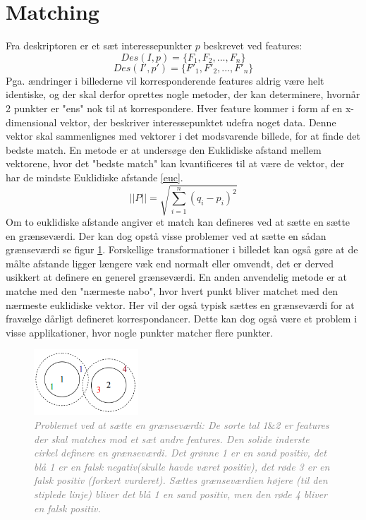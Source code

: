 \section{Matching}
Fra deskriptoren er et sæt interessepunkter $p$ beskrevet ved features:
$$ Des(I,p)= \lbrace F_1,F_2,...,F_n \rbrace $$
$$ Des(I',p')=\lbrace F'_1,F'_2,...,F'_n \rbrace $$
Pga. ændringer i billederne vil korresponderende features aldrig være helt identiske, og der skal derfor oprettes nogle metoder, der kan determinere, hvornår 2 punkter er "ens" nok til at korrespondere.
Hver feature kommer i form af en x-dimensional vektor, der beskriver interessepunktet udefra noget data. Denne vektor skal sammenlignes med vektorer i det modsvarende billede, for at finde det bedste match. En metode er at undersøge den Euklidiske afstand mellem vektorene, hvor det "bedste match" kan kvantificeres til at være de vektor, der har de mindste Euklidiske afstande \eqref{euc}. 
\begin{equation}
||P|| = \sqrt{\sum\limits_{i=1}^n(q_i-p_i)^2}
\label{euc}
\end{equation}
Om to euklidiske afstande angiver et match kan defineres ved at sætte en sætte en grænseværdi. Der kan dog opstå visse problemer ved at sætte en sådan grænseværdi se figur \ref{fig:skift}. Forskellige transformationer i billedet kan også gøre at de målte afstande ligger længere væk end normalt eller omvendt, det er derved usikkert at definere en generel grænseværdi. En anden anvendelig metode er at matche med den "nærmeste nabo", hvor hvert punkt bliver matchet med den nærmeste euklidiske vektor. Her vil der også typisk sættes en grænseværdi for at fravælge dårligt defineret korrespondancer. Dette kan dog også være et problem i visse applikationer, hvor nogle punkter matcher flere punkter.
\begin{figure}[H]
    \centering
    \includegraphics[width=0.35\textwidth]{fig/22.png}
    \vspace{-0.5em}   
    \begin{center}
    \caption{\textcolor{gray}{\footnotesize \textit{Problemet ved at sætte en grænseværdi: De sorte tal 1$\&$2 er features der skal matches mod et sæt andre features. Den solide inderste cirkel definere  en grænseværdi. Det grønne {\color{OliveGreen}1} er en sand positiv, det blå {\color{blue}1} er en falsk negativ(skulle havde været positiv), det røde {\color{red}3} er en falsk positiv (forkert vurderet). Sættes grænseværdien højere (til den stiplede linje) bliver det blå {\color{blue}1} en sand positiv, men den røde {\color{BrickRed} 4} bliver en falsk positiv. \cite{book1}}}}
    \label{fig:skift}
     \end{center}
  \end{figure}

